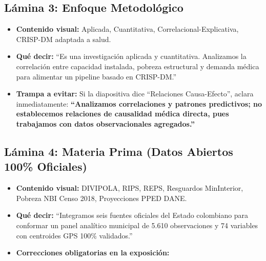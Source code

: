 \documentclass[11pt,a4paper]{article}
\begin{document}
\subsection{Lámina 3: Enfoque Metodológico}
\begin{itemize}[leftmargin=*]
  \item \textbf{Contenido visual:} Aplicada, Cuantitativa, Correlacional-Explicativa, CRISP-DM adaptada a salud.
  \item \textbf{Qué decir:} ``Es una investigación aplicada y cuantitativa. Analizamos la correlación entre capacidad instalada, pobreza estructural y demanda médica para alimentar un pipeline basado en CRISP-DM.''
  \item \textbf{Trampa a evitar:} Si la diapositiva dice ``Relaciones Causa-Efecto'', aclara inmediatamente: \textbf{``Analizamos correlaciones y patrones predictivos; no establecemos relaciones de causalidad médica directa, pues trabajamos con datos observacionales agregados.''}
\end{itemize}

\subsection{Lámina 4: Materia Prima (Datos Abiertos 100\% Oficiales)}
\begin{itemize}[leftmargin=*]
  \item \textbf{Contenido visual:} DIVIPOLA, RIPS, REPS, Resguardos MinInterior, Pobreza NBI Censo 2018, Proyecciones PPED DANE.
  \item \textbf{Qué decir:} ``Integramos seis fuentes oficiales del Estado colombiano para conformar un panel analítico municipal de 5.610 observaciones y 74 variables con centroides GPS 100\% validados.''
  \item \textbf{Correcciones obligatorias en la exposición:}
\end{itemize}
\end{document}
